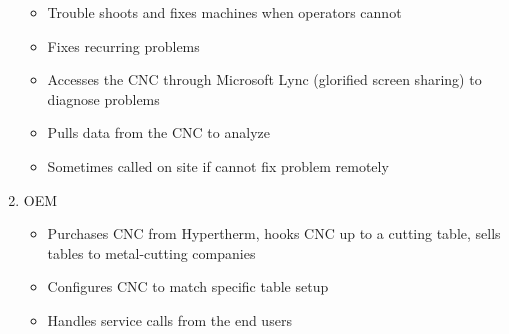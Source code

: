 \documentclass[12pt,letterpaper,titlepage]{article}
\newlength{\wideitemsep}
\let\olditem\item
\renewcommand{\item}{\setlength{\itemsep}{\wideitemsep}\olditem}
\begin{document}
\begin{enumerate}
\begin{itemize}
\item Trouble shoots and fixes machines when operators cannot
\item Fixes recurring problems
\item Accesses the CNC through Microsoft Lync (glorified screen sharing) to diagnose problems
\item Pulls data from the CNC to analyze
\item Sometimes called on site if cannot fix problem remotely
\end{itemize}
\item OEM
\begin{itemize}
\item Purchases CNC from Hypertherm, hooks CNC up to a cutting table, sells tables to metal-cutting companies
\item Configures CNC to match specific table setup
\item Handles service calls from the end users
\end{itemize}
\end{enumerate}

\newpage
\end{document}
